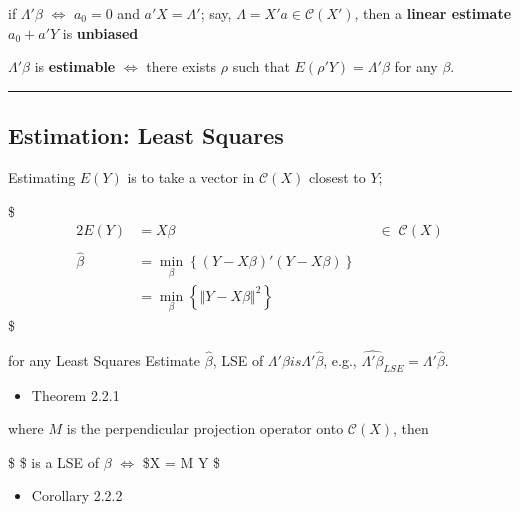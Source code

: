 \documentclass[
]{book}
\providecommand{\tightlist}{%
  \setlength{\itemsep}{0pt}\setlength{\parskip}{0pt}}
\begin{document}
{{{if \(\Lambda ' \beta\) \(\iff\) \(a_0 = 0\) and \(a ' X = \Lambda'\); say, \(\Lambda = X ' a \in \mathcal{C}(X')\), then a \textbf{linear estimate} \(a_0 + a ' Y\) is \textbf{unbiased}

\(\Lambda ' \beta\) is \textbf{estimable} \(\iff\) there exists \(\rho\) such that \(E(\rho ' Y ) = \Lambda ' \beta\) for any \(\beta\).

\begin{center}\rule{0.5\linewidth}{0.5pt}\end{center}

\hypertarget{estimation-least-squares}{%
\subsection{Estimation: Least Squares}\label{estimation-least-squares}}

Estimating \(E(Y)\) is to take a vector in \(\mathcal{C}(X)\) closest to \(Y\);

\$
\begin{alignat}{2}

E(Y) &= X\beta \; &&\in \; \mathcal{C}(X)\\

\\

\hat \beta &= \min_\beta \left\{ (Y-X \beta) ' (Y-X \beta)  \right\} \\
&= \min_\beta \left\{ \Vert Y-X \beta \Vert^2   \right\}

\tag{Least Squares Estimate of beta}


\end{alignat}
\$

for any Least Squares Estimate \(\hat \beta\), LSE of \(\Lambda ' \beta is \Lambda ' \hat \beta\), e.g., \(\hat {\Lambda ' \beta}_{LSE} = \Lambda ' \hat \beta\).

\begin{itemize}
\tightlist
\item
  Theorem 2.2.1
\end{itemize}

where \(M\) is the perpendicular projection operator onto \(\mathcal{C}(X)\), then

\$
\hat \beta\$ is a LSE of \(\beta\) \(\iff\) \$X \hat \beta = M Y
\$

\begin{itemize}
\tightlist
\item
  Corollary 2.2.2
\end{itemize}

}}}
\end{document}
